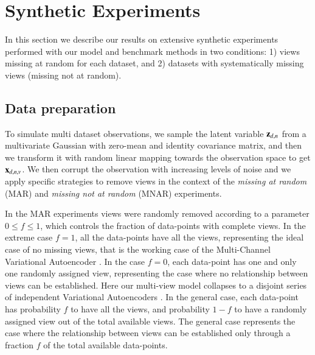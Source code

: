 \section{Synthetic Experiments}

In this section we describe our results on extensive synthetic experiments performed with our model and benchmark methods in two conditions:
1) views missing at random for each dataset,
and 2) datasets with systematically missing views (missing not at random).

\subsection{Data preparation}
\label{ssec:synth}

To simulate multi dataset observations, we sample the latent variable $\mathbf{z}_{d,n}$ from a multivariate Gaussian with zero-mean and identity covariance matrix, and then we transform it with random linear mapping towards the observation space to get $\mathbf{x}_{d,n,v}$.
We then corrupt the observation with increasing levels of noise
and we apply specific strategies to remove views in the context of the \textit{missing at random} (MAR) and \textit{missing not at random} (MNAR) experiments.

In the MAR experiments views were randomly removed according to a parameter $0 \leq f \leq 1$, which controls the fraction of data-points with complete views.
In the extreme case $f=1$, all the data-points have all the views, representing the ideal case of no missing views, that is the working case of the Multi-Channel Variational Autoencoder \citep{Antelmi2019}.
In the case $f=0$, each data-point has one and only one randomly assigned view, representing the case where no relationship between views can be established.
Here our multi-view model collapses to a disjoint series of independent Variational Autoencoders \citep{Kingma2013, Rezende2014}.
In the general case, each data-point has probability $f$ to have all the views, and probability $1-f$ to have a randomly assigned view out of the total available views.
The general case represents the case where the relationship between views can be established only through a fraction $f$ of the total available data-points.


